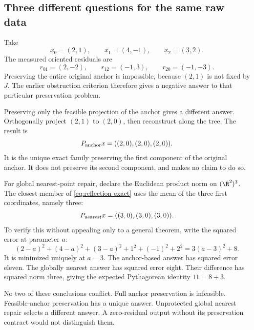 
\subsection{Three different questions for the same raw data}
Take
\[
 x_0=(2,1),\qquad x_1=(4,-1),\qquad x_2=(3,2).
\]
The measured oriented residuals are
\[
 r_{01}=(2,-2),\qquad r_{12}=(-1,3),\qquad r_{20}=(-1,-3).
\]
Preserving the entire original anchor is impossible, because \((2,1)\) is not fixed by \(J\). The earlier obstruction criterion therefore gives a negative answer to that particular preservation problem.

Preserving only the feasible projection of the anchor gives a different answer. Orthogonally project \((2,1)\) to \((2,0)\), then reconstruct along the tree. The result is
\[
 P_{\rm anchor}x=((2,0),(2,0),(2,0)).
\]
It is the unique exact family preserving the first component of the original anchor. It does not preserve its second component, and makes no claim to do so.

For global nearest-point repair, declare the Euclidean product norm on \((\R^2)^3\). The closest member of \eqref{eq:reflection-exact} uses the mean of the three first coordinates, namely three:
\[
 P_{\rm nearest}x=((3,0),(3,0),(3,0)).
\]
To verify this without appealing only to a general theorem, write the squared error at parameter \(a\):
\[
 (2-a)^2+(4-a)^2+(3-a)^2+1^2+(-1)^2+2^2
 =3(a-3)^2+8.
\]
It is minimized uniquely at \(a=3\). The anchor-based answer has squared error eleven. The globally nearest answer has squared error eight. Their difference has squared norm three, giving the expected Pythagorean identity \(11=8+3\).

No two of these conclusions conflict. Full anchor preservation is infeasible. Feasible-anchor preservation has a unique answer. Unprotected global nearest repair selects a different answer. A zero-residual output without its preservation contract would not distinguish them.

